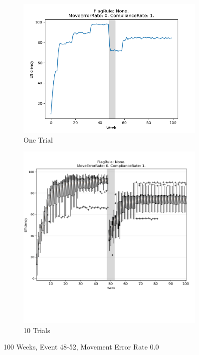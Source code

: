 \documentclass{article}%
\begin{document}
\begin{figure}[!htb]%
\begin{subfigure}[b]{0.45\linewidth}%
\includegraphics[width=\linewidth]{0000fr_None_er_0_cr_1_t1.png}%
\caption{One Trial}%
\end{subfigure}%
\begin{subfigure}[b]{0.45\linewidth}%
\includegraphics[clip,width=\linewidth,trim=0 4cm 0 0]{0000fr_None_er_0_cr_1_t10.png}%
\caption{10 Trials}%
\end{subfigure}%
\caption{100 Weeks, Event 48{-}52, Movement Error Rate 0.0}%
\end{figure}
\end{document}
